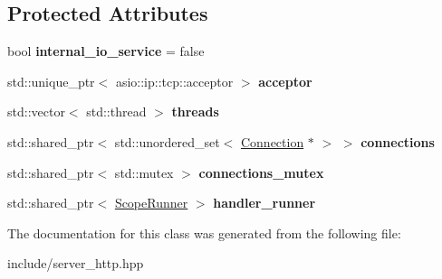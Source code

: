 \subsection*{Protected Attributes}
\begin{DoxyCompactItemize}
\item 
bool {\bfseries internal\+\_\+io\+\_\+service} = false\hypertarget{classSimpleWeb_1_1ServerBase_a2423e3d4efc52a13c478f50fe4e1e290}{}\label{classSimpleWeb_1_1ServerBase_a2423e3d4efc52a13c478f50fe4e1e290}

\item 
std\+::unique\+\_\+ptr$<$ asio\+::ip\+::tcp\+::acceptor $>$ {\bfseries acceptor}\hypertarget{classSimpleWeb_1_1ServerBase_a79b53186c927fe62a5e65207c291d5e8}{}\label{classSimpleWeb_1_1ServerBase_a79b53186c927fe62a5e65207c291d5e8}

\item 
std\+::vector$<$ std\+::thread $>$ {\bfseries threads}\hypertarget{classSimpleWeb_1_1ServerBase_aa23ee1c2fa4809d032be37ae7e605249}{}\label{classSimpleWeb_1_1ServerBase_aa23ee1c2fa4809d032be37ae7e605249}

\item 
std\+::shared\+\_\+ptr$<$ std\+::unordered\+\_\+set$<$ \hyperlink{classSimpleWeb_1_1ServerBase_1_1Connection}{Connection} $\ast$ $>$ $>$ {\bfseries connections}\hypertarget{classSimpleWeb_1_1ServerBase_a3427aaedec5c00eb0334254b00318898}{}\label{classSimpleWeb_1_1ServerBase_a3427aaedec5c00eb0334254b00318898}

\item 
std\+::shared\+\_\+ptr$<$ std\+::mutex $>$ {\bfseries connections\+\_\+mutex}\hypertarget{classSimpleWeb_1_1ServerBase_a699f0cd0b7a7e0da651cb7882230a3ba}{}\label{classSimpleWeb_1_1ServerBase_a699f0cd0b7a7e0da651cb7882230a3ba}

\item 
std\+::shared\+\_\+ptr$<$ \hyperlink{classSimpleWeb_1_1ScopeRunner}{Scope\+Runner} $>$ {\bfseries handler\+\_\+runner}\hypertarget{classSimpleWeb_1_1ServerBase_a9a5c8ad99096f71cea19196f52cfbd00}{}\label{classSimpleWeb_1_1ServerBase_a9a5c8ad99096f71cea19196f52cfbd00}

\end{DoxyCompactItemize}


The documentation for this class was generated from the following file\+:\begin{DoxyCompactItemize}
\item 
include/server\+\_\+http.\+hpp\end{DoxyCompactItemize}

